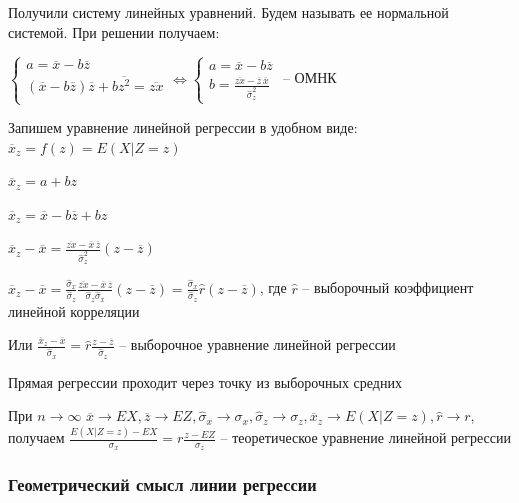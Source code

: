 Получили систему линейных уравнений. Будем называть ее нормальной системой. При решении получаем:

$\begin{cases}
    a = \overline{x} - b \overline{z} \\
    (\overline{x} - b \overline{z}) \overline{z} + b \overline{z^2} = \overline{zx} \\
\end{cases} \Longleftrightarrow \begin{cases}
    a = \overline{x} - b \overline{z} \\
    b = \frac{\overline{zx} - \overline{z} \, \overline{x}}{\hat \sigma^2_z}
\end{cases}$ -- ОМНК 

Запишем уравнение линейной регрессии в удобном виде: $\overline{x}_z = f(z) = E(X | Z = z)$

$\overline{x}_z = a + bz$

$\overline{x}_z = \overline{x} - b \overline{z} + bz$

$\overline{x}_z - \overline{x} = \frac{\overline{z x} - \overline{x} \, \overline{z}}{\hat \sigma^2_z} (z - \overline{z})$

$\overline{x}_z - \overline{x} = \frac{\hat \sigma_x}{\hat \sigma_z} \frac{\overline{z x} - \overline{x} \, \overline{z}}{\hat \sigma_z \hat \sigma_x} (z - \overline{z}) = 
\frac{\hat \sigma_x}{\hat \sigma_z} \hat r (z - \overline{z})$, где $\hat r$ -- выборочный коэффициент линейной корреляции

Или $\frac{\overline{x}_z - \overline{x}}{\hat \sigma_x} = \hat r \frac{z - \overline{z}}{\hat \sigma_z}$ -- выборочное уравнение линейной регрессии

\Nota Прямая регрессии проходит через точку из выборочных средних

\Notas При $n \to \infty$ $\overline{x} \longrightarrow EX, \overline{z} \longrightarrow EZ, \hat \sigma_x \longrightarrow \sigma_x,
\hat \sigma_z \longrightarrow \sigma_z, \overline{x}_z \longrightarrow E(X | Z = z), \hat r \longrightarrow r$, получаем 
$\frac{E(X | Z = z) - EX}{\sigma_x} = r \frac{z - EZ}{\sigma_z}$ -- теоретическое уравнение линейной регрессии

\subsubsection{Геометрический смысл линии регрессии}



